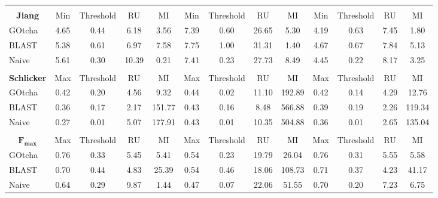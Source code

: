 \begin{table}[h!]
{\begin{tabular}{c|cccc|cccc|cccc}
\multicolumn{1}{l}{\hphantom} & & & &\multicolumn{1}{c}{\hphantom} & & & & \multicolumn{1}{c}{\hphantom} & & & &\\

\bf Jiang & Min & Threshold & RU & MI & Min & Threshold & RU & MI & Min & Threshold & RU & MI\\
\hline
\multicolumn{1}{l|}{GOtcha}& 4.65 & 0.44 & 6.18 & 3.56 & 7.39 & 0.60 & 26.65 & 5.30 & 4.19 & 0.63 & 7.45 & 1.80 \\
\multicolumn{1}{l|}{BLAST}& 5.38 & 0.61 & 6.97 & 7.58 & 7.75 & 1.00 & 31.31 & 1.40 & 4.67 & 0.67 & 7.84 & 5.13 \\
\multicolumn{1}{l|}{Naive}& 5.61 & 0.30 & 10.39 & 0.21 & 7.41 & 0.23 & 27.73 & 8.49 & 4.45 & 0.22 & 8.17 & 3.25 \\


\multicolumn{1}{l}{\hphantom} & & & &\multicolumn{1}{c}{\hphantom} & & & & \multicolumn{1}{c}{\hphantom} & & & &\\

\bf Schlicker & Max & Threshold & RU & MI & Max & Threshold & RU & MI & Max & Threshold & RU & MI\\
\hline
\multicolumn{1}{l|}{GOtcha}& 0.42 & 0.20 & 4.56 & 9.32 & 0.44 & 0.02 & 11.10 & 192.89 & 0.42 & 0.14 & 4.29 & 12.76 \\
\multicolumn{1}{l|}{BLAST}& 0.36 & 0.17 & 2.17 & 151.77 & 0.43 & 0.16 & 8.48 & 566.88 & 0.39 & 0.19 & 2.26 & 119.34 \\
\multicolumn{1}{l|}{Naive}& 0.27 & 0.01 & 5.07 & 177.91 & 0.43 & 0.01 & 10.35 & 504.88 & 0.36 & 0.01 & 2.65 & 135.04 \\

\multicolumn{1}{l}{\hphantom} & & & &\multicolumn{1}{c}{\hphantom} & & & & \multicolumn{1}{c}{\hphantom} & & & &\\

$\mathbf{ F_{max} }$ & Max & Threshold & RU & MI & Max & Threshold & RU & MI & Max & Threshold & RU & MI\\
\hline
\multicolumn{1}{l|}{GOtcha}& 0.76 & 0.33 & 5.45 & 5.41 & 0.54 & 0.23 & 19.79 & 26.04 & 0.76 & 0.31 & 5.55 & 5.58 \\
\multicolumn{1}{l|}{BLAST}& 0.70 & 0.44 & 4.83 & 25.39 & 0.54 & 0.46 & 18.06 & 108.73 & 0.71 & 0.37 & 4.23 & 41.17 \\
\multicolumn{1}{l|}{Naive}& 0.64 & 0.29 & 9.87 & 1.44 & 0.47 & 0.07 & 22.06 & 51.55 & 0.70 & 0.20 & 7.23 & 6.75 \\


\end{tabular}}{}
\end{table}


